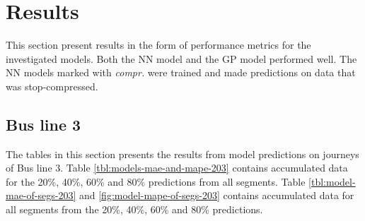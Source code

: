 
\captionsetup{width=.75\textwidth}


\chapter{Results}
\label{cha:results}
This section present results in the form of performance metrics for the investigated models. Both the NN model and the GP model performed well. The NN models marked with \emph{compr.} were trained and made predictions on data that was stop-compressed.

\section{Bus line 3}
The tables in this section presents the results from model predictions on journeys of Bus line 3. Table \ref{tbl:models-mae-and-mape-203} contains accumulated data for the 20\%, 40\%, 60\% and 80\% predictions from all segments. Table \ref{tbl:model-mae-of-segs-203} and \ref{fig:model-mape-of-segs-203} contains accumulated data for all segments from the 20\%, 40\%, 60\% and 80\% predictions.
 
